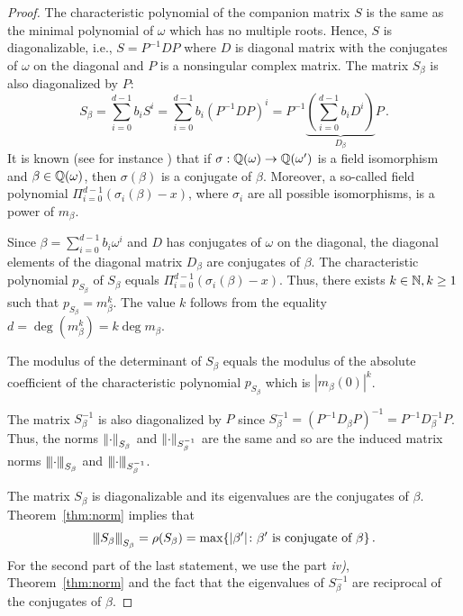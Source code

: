 \begin{proof}
The characteristic polynomial of the companion matrix $S$ is the same as the minimal polynomial of $\omega$ which has no multiple roots. Hence, $S$ is diagonalizable, i.e., $S=P^{-1}DP$ where $D$ is diagonal matrix with the conjugates of $\omega$ on the diagonal and $P$ is a nonsingular complex matrix. The matrix $S_\beta$ is also diagonalized by $P$:
$$
S_\beta=\sum_{i=0}^{d-1} b_i S^i= \sum_{i=0}^{d-1} b_i \left(P^{-1}DP\right)^i=P^{-1}\underbrace{\left(\sum_{i=0}^{d-1} b_i D^i\right)}_{D_\beta}P\,.
$$
It is known (see for instance \cite{chapman}) that if $\sigma:\mathbb{Q}(\omega)\rightarrow\mathbb{Q}(\omega')$ is a field isomorphism and $\beta\in\mathbb{Q}(\omega)$, then $\sigma(\beta)$ is a conjugate of $\beta$. Moreover, a so-called field polynomial $\Pi_{i=0}^{d-1}(\sigma_i(\beta)-x)$, where $\sigma_i$ are all possible isomorphisms, is a power of $m_\beta$.


Since $\beta=\sum_{i=0}^{d-1} b_i \omega^i$ and $D$ has conjugates of $\omega$ on the diagonal, the diagonal elements of the diagonal matrix $D_\beta$ are conjugates of $\beta$. The characteristic polynomial $p_{S_\beta}$ of $S_\beta$ equals $\Pi_{i=0}^{d-1}(\sigma_i(\beta)-x)$. Thus, there exists $k\in\mathbb{N}, k\geq 1$ such that $p_{S_\beta}=m^k_\beta$. The value $k$ follows from the equality $d=\deg(m_\beta^k)=k \deg m_\beta$. 

The modulus of the determinant of $S_\beta$ equals the modulus of the absolute coefficient of the characteristic polynomial $p_{S_\beta}$ which is $|m_\beta(0)|^k$.

The matrix $S_\beta^{-1}$ is also diagonalized by $P$ since $S_\beta^{-1}=(P^{-1}D_\beta P)^{-1}=P^{-1}D_\beta^{-1}P$. Thus, the norms $\left\lVert\cdot\right\rVert_{S_\beta}$ and $\left\lVert\cdot\right\rVert_{S_\beta^{-1}}$ are the same and so are the induced matrix norms ${\left\vert\kern-0.25ex\left\vert\kern-0.25ex\left\vert \cdot\right\vert\kern-0.25ex\right\vert\kern-0.25ex\right\vert}_{S_\beta}$ and ${\left\vert\kern-0.25ex\left\vert\kern-0.25ex\left\vert \cdot\right\vert\kern-0.25ex\right\vert\kern-0.25ex\right\vert}_{S_\beta^{-1}}$.

The matrix $S_\beta$ is diagonalizable and its eigenvalues are the conjugates of $\beta$. Theorem~\ref{thm:norm} implies that 
$$
{\left\vert\kern-0.25ex\left\vert\kern-0.25ex\left\vert S_\beta\right\vert\kern-0.25ex\right\vert\kern-0.25ex\right\vert}_{S_\beta}=\rho(S_\beta)= \max \{|\beta'| \colon \beta' \text{ is conjugate of } \beta\}\,. 
$$
For the second part of the last statement, we use the part \textit{iv)}, Theorem~\ref{thm:norm} and the fact that the eigenvalues of $S_\beta^{-1}$ are  reciprocal of the conjugates of $\beta$.
\end{proof}

